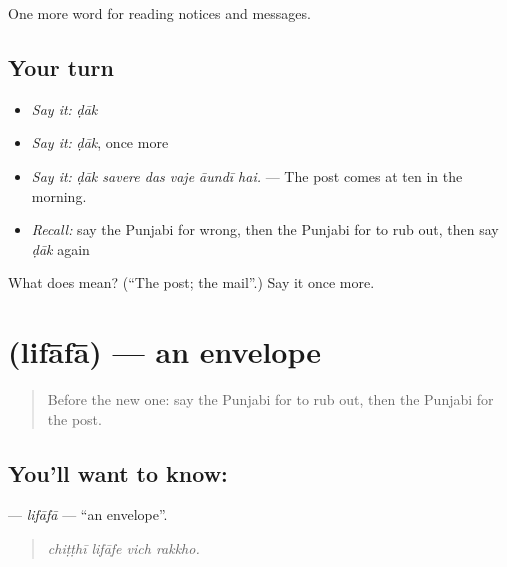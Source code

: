 \begin{grammarlens}[title={What you've built}]
One more word for reading notices and messages.
\end{grammarlens}

\subsection*{Your turn}
\begin{itemize}
\raggedright
  \item \emph{Say it:} \emph{ḍāk}
  \item \emph{Say it:} \emph{ḍāk}, once more
  \item \emph{Say it:} \emph{ḍāk savere das vaje āundī hai.} — The post comes at ten in the morning.
  \item \emph{Recall:} say the Punjabi for wrong, then the Punjabi for to rub out, then say \emph{ḍāk} again
\end{itemize}

\begin{tcolorbox}[breakable,colback=teal!4,colframe=teal!35!black,title={Before you move on}]
What does  mean? (\textquotedblleft{}The post; the mail\textquotedblright{}.) Say it once more.
\end{tcolorbox}
\section[\texorpdfstring{\pa{ਲਿਫ਼ਾਫ਼ਾ} (lifāfā)}{ਲਿਫ਼ਾਫ਼ਾ (lifāfā)}]{ (lifāfā) — an envelope}

\label{lesson:PA-C255-lifafa}



\begin{quote}
Before the new one: say the Punjabi for to rub out, then the Punjabi for the post.
\end{quote}

\subsection*{You'll want to know: }
\textbf{} — \emph{lifāfā} — \textquotedblleft{}an envelope\textquotedblright{}.

\begin{quote}
   
\end{quote}

\begin{quote}
\emph{chiṭṭhī lifāfe vich rakkho.}
\end{quote}


